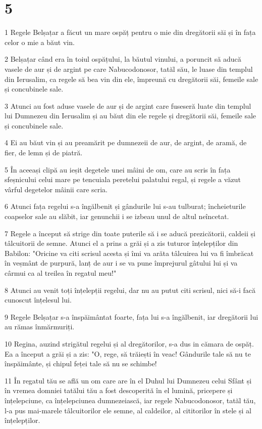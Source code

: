\chapter{5}

\par 1 Regele Belșațar a făcut un mare ospăț pentru o mie din dregătorii săi și în fața celor o mie a băut vin.
\par 2 Belșațar când era în toiul ospățului, la băutul vinului, a poruncit să aducă vasele de aur și de argint pe care Nabucodonosor, tatăl său, le luase din templul din Ierusalim, ca regele să bea vin din ele, împreună cu dregătorii săi, femeile sale și concubinele sale.
\par 3 Atunci au fost aduse vasele de aur și de argint care fuseseră luate din templul lui Dumnezeu din Ierusalim și au băut din ele regele și dregătorii săi, femeile sale și concubinele sale.
\par 4 Ei au băut vin și au preamărit pe dumnezeii de aur, de argint, de aramă, de fier, de lemn și de piatră.
\par 5 În aceeași clipă au ieșit degetele unei mâini de om, care au scris în fața sfeșnicului celui mare pe tencuiala peretelui palatului regal, și regele a văzut vârful degetelor mâinii care scria.
\par 6 Atunci fața regelui s-a îngălbenit și gândurile lui s-au tulburat; încheieturile coapselor sale au slăbit, iar genunchii i se izbeau unul de altul neîncetat.
\par 7 Regele a început să strige din toate puterile să i se aducă prezicătorii, caldeii și tâlcuitorii de semne. Atunci el a prins a grăi și a zis tuturor înțelepților din Babilon: "Oricine va citi scrisul acesta și îmi va arăta tâlcuirea lui va fi îmbrăcat în veșmânt de purpură, lanț de aur i se va pune împrejurul gâtului lui și va cârmui ca al treilea în regatul meu!"
\par 8 Atunci au venit toți înțelepții regelui, dar nu au putut citi scrisul, nici să-i facă cunoscut înțelesul lui.
\par 9 Regele Belșațar s-a înspăimântat foarte, fața lui s-a îngălbenit, iar dregătorii lui au rămas înmărmuriți.
\par 10 Regina, auzind strigătul regelui și al dregătorilor, s-a dus in cămara de ospăț. Ea a început a grăi și a zis: "O, rege, să trăiești în veac! Gândurile tale să nu te înspăimânte, și chipul feței tale să nu se schimbe!
\par 11 În regatul tău se află un om care are în el Duhul lui Dumnezeu celui Sfânt și în vremea domniei tatălui tău a fost descoperită în el lumină, pricepere și înțelepciune, ca înțelepciunea dumnezeiască, iar regele Nabucodonosor, tatăl tău, l-a pus mai-marele tâlcuitorilor ele semne, al caldeilor, al cititorilor în stele și al înțelepților.
